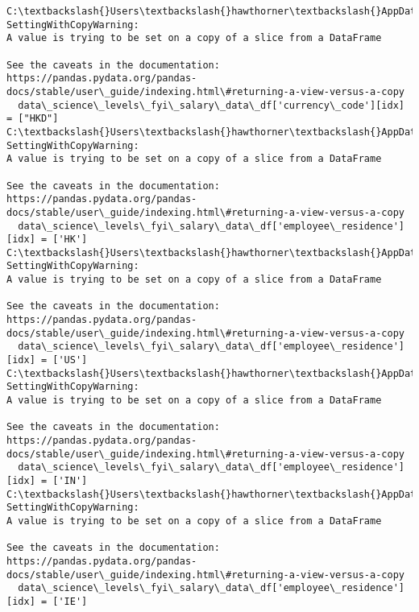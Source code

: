 \documentclass[11pt]{article}
\begin{document}
    \begin{Verbatim}[commandchars=\\\{\}]
C:\textbackslash{}Users\textbackslash{}hawthorner\textbackslash{}AppData\textbackslash{}Local\textbackslash{}Temp\textbackslash{}ipykernel\_22188\textbackslash{}1514313522.py:3:
SettingWithCopyWarning:
A value is trying to be set on a copy of a slice from a DataFrame

See the caveats in the documentation: https://pandas.pydata.org/pandas-
docs/stable/user\_guide/indexing.html\#returning-a-view-versus-a-copy
  data\_science\_levels\_fyi\_salary\_data\_df['currency\_code'][idx] = ["HKD"]
C:\textbackslash{}Users\textbackslash{}hawthorner\textbackslash{}AppData\textbackslash{}Local\textbackslash{}Temp\textbackslash{}ipykernel\_22188\textbackslash{}1514313522.py:4:
SettingWithCopyWarning:
A value is trying to be set on a copy of a slice from a DataFrame

See the caveats in the documentation: https://pandas.pydata.org/pandas-
docs/stable/user\_guide/indexing.html\#returning-a-view-versus-a-copy
  data\_science\_levels\_fyi\_salary\_data\_df['employee\_residence'][idx] = ['HK']
C:\textbackslash{}Users\textbackslash{}hawthorner\textbackslash{}AppData\textbackslash{}Local\textbackslash{}Temp\textbackslash{}ipykernel\_22188\textbackslash{}1514313522.py:8:
SettingWithCopyWarning:
A value is trying to be set on a copy of a slice from a DataFrame

See the caveats in the documentation: https://pandas.pydata.org/pandas-
docs/stable/user\_guide/indexing.html\#returning-a-view-versus-a-copy
  data\_science\_levels\_fyi\_salary\_data\_df['employee\_residence'][idx] = ['US']
C:\textbackslash{}Users\textbackslash{}hawthorner\textbackslash{}AppData\textbackslash{}Local\textbackslash{}Temp\textbackslash{}ipykernel\_22188\textbackslash{}1514313522.py:10:
SettingWithCopyWarning:
A value is trying to be set on a copy of a slice from a DataFrame

See the caveats in the documentation: https://pandas.pydata.org/pandas-
docs/stable/user\_guide/indexing.html\#returning-a-view-versus-a-copy
  data\_science\_levels\_fyi\_salary\_data\_df['employee\_residence'][idx] = ['IN']
C:\textbackslash{}Users\textbackslash{}hawthorner\textbackslash{}AppData\textbackslash{}Local\textbackslash{}Temp\textbackslash{}ipykernel\_22188\textbackslash{}1514313522.py:12:
SettingWithCopyWarning:
A value is trying to be set on a copy of a slice from a DataFrame

See the caveats in the documentation: https://pandas.pydata.org/pandas-
docs/stable/user\_guide/indexing.html\#returning-a-view-versus-a-copy
  data\_science\_levels\_fyi\_salary\_data\_df['employee\_residence'][idx] = ['IE']
    \end{Verbatim}
\end{document}
